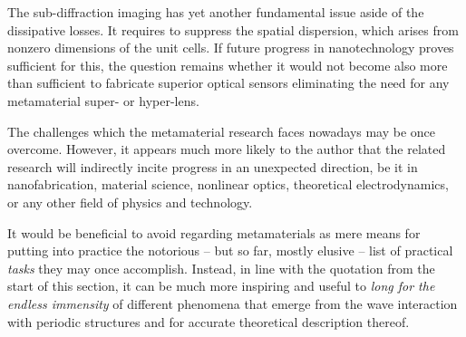 The sub-diffraction imaging has yet another fundamental issue aside of the dissipative losses. It requires to suppress the spatial dispersion, which arises from nonzero dimensions of the unit cells. If future progress in nanotechnology proves sufficient for this, the question remains whether it would not become also more than sufficient to fabricate superior optical sensors eliminating the need for any metamaterial super- or hyper-lens. 

The challenges which the metamaterial research faces nowadays may be once overcome. However, it appears much more likely to the author that the related research will indirectly incite progress in an unexpected direction, be it in nanofabrication, material science, nonlinear optics, theoretical electrodynamics, or any other field of physics and technology.

It would be beneficial to avoid regarding metamaterials as mere means for putting into practice the notorious -- but so far, mostly elusive -- list of practical \textit{tasks} they may once accomplish. Instead, in line with the quotation from the start of this section, it can be much more inspiring and useful to \textit{long for the endless immensity} of different phenomena that emerge from the wave interaction with periodic structures and for accurate theoretical description thereof. 

